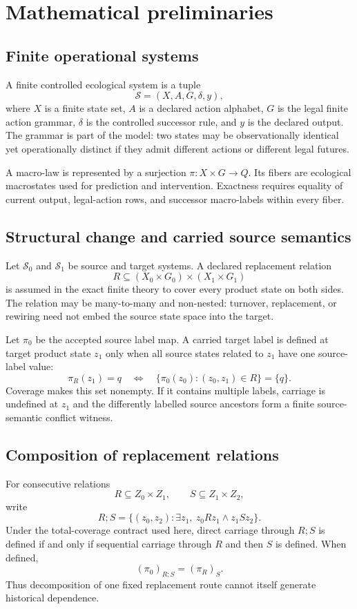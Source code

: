 \section{Mathematical preliminaries}

\subsection{Finite operational systems}
A finite controlled ecological system is a tuple
\[
\mathcal{S}=(X,A,G,\delta,y),
\]
where $X$ is a finite state set, $A$ is a declared action alphabet, $G$ is the legal finite action grammar, $\delta$ is the controlled successor rule, and $y$ is the declared output. The grammar is part of the model: two states may be observationally identical yet operationally distinct if they admit different actions or different legal futures.

A macro-law is represented by a surjection $\pi:X\times G\to Q$. Its fibers are ecological macrostates used for prediction and intervention. Exactness requires equality of current output, legal-action rows, and successor macro-labels within every fiber.

\subsection{Structural change and carried source semantics}
Let $\mathcal{S}_0$ and $\mathcal{S}_1$ be source and target systems. A declared replacement relation
\[
R\subseteq (X_0\times G_0)\times(X_1\times G_1)
\]
is assumed in the exact finite theory to cover every product state on both sides. The relation may be many-to-many and non-nested: turnover, replacement, or rewiring need not embed the source state space into the target.

Let $\pi_0$ be the accepted source label map. A carried target label is defined at target product state $z_1$ only when all source states related to $z_1$ have one source-label value:
\[
\pi_R(z_1)=q
\quad\Longleftrightarrow\quad
\{\pi_0(z_0):(z_0,z_1)\in R\}=\{q\}.
\]
Coverage makes this set nonempty. If it contains multiple labels, carriage is undefined at $z_1$ and the differently labelled source ancestors form a finite source-semantic conflict witness.

\subsection{Composition of replacement relations}
For consecutive relations
\[
R\subseteq Z_0\times Z_1,
\qquad
S\subseteq Z_1\times Z_2,
\]
write
\[
R;S=\{(z_0,z_2):\exists z_1,\ z_0Rz_1\land z_1Sz_2\}.
\]
Under the total-coverage contract used here, direct carriage through $R;S$ is defined if and only if sequential carriage through $R$ and then $S$ is defined. When defined,
\[
(\pi_0)_{R;S}=(\pi_R)_S.
\]
Thus decomposition of one fixed replacement route cannot itself generate historical dependence.

